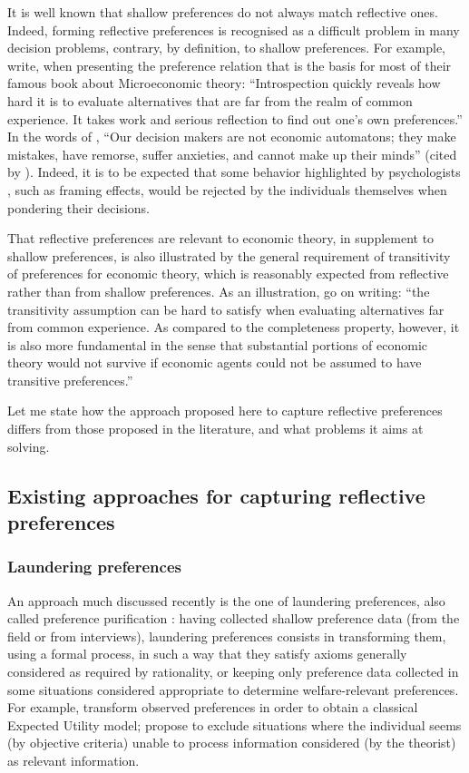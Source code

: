 \documentclass[version=last, pagesize, twoside=off, bibliography=totoc, DIV=calc, fontsize=12pt, a4paper, french, english]{scrartcl}
\begin{document}
It is well known that shallow preferences do not always match reflective ones.
Indeed, forming reflective preferences is recognised as a difficult problem in many decision problems, contrary, by definition, to shallow preferences. For example, \citet[p.\ 6]{colell_microeconomic_1995} write, when presenting the preference relation that is the basis for most of their famous book about Microeconomic theory: “Introspection quickly reveals how hard it is to evaluate alternatives that are far from the realm of common experience. It takes work and serious reflection to find out one’s own preferences.” 
In the words of \citet[p.\ 9]{bell_descriptive_1988}, “Our decision makers are not economic automatons; they make mistakes, have remorse, suffer anxieties, and cannot make up their minds” (cited by \citet[p.\ 87]{deparis_etude_2012}).
Indeed, it is to be expected that some behavior highlighted by psychologists \citep{kahneman_thinking_2012}, such as framing effects, would be rejected by the individuals themselves when pondering their decisions. 

That reflective preferences are relevant to economic theory, in supplement to shallow preferences, is also illustrated by the general requirement of transitivity of preferences for economic theory, which is reasonably expected from reflective rather than from shallow preferences. As an illustration, \citet[p.\ 7]{colell_microeconomic_1995} go on writing: “the transitivity assumption can be hard to satisfy when evaluating alternatives far from common experience. As compared to the completeness property, however, it is also more fundamental in the sense that substantial portions of economic theory would not survive if economic agents could not be assumed to have transitive preferences.” 

Let me state how the approach proposed here to capture reflective preferences differs from those proposed in the literature, and what problems it aims at solving.

\subsection{Existing approaches for capturing reflective preferences}
\subsubsection{Laundering preferences}
An approach much discussed recently is the one of laundering preferences, also called preference purification \citep{bernheim_beyond_2009, rubinstein_eliciting_2011, infante_preference_2016}: having collected shallow preference data (from the field or from interviews), laundering preferences consists in transforming them, using a formal process, in such a way that they satisfy axioms generally considered as required by rationality, or keeping only preference data collected in some situations considered appropriate to determine welfare-relevant preferences. For example, \citet{bleichrodt_making_2001} transform observed preferences in order to obtain a classical Expected Utility model; \citet{bernheim_beyond_2009} propose to exclude situations where the individual seems (by objective criteria) unable to process information considered (by the theorist) as relevant information. 
\end{document}
